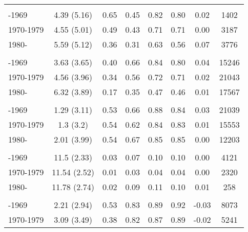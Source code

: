\begin{ThreePartTable}
\begin{longtable}[t]{lccccccc}
\addlinespace[0.3em]
\multicolumn{8}{l}{\textbf{Liberia}}\\
\hspace{1em}-1969 & 4.39 (5.16) & 0.65 & 0.45 & 0.82 & 0.80 & 0.02 & 1402\\
\hspace{1em}1970-1979 & 4.55 (5.01) & 0.49 & 0.43 & 0.71 & 0.71 & 0.00 & 3187\\
\hspace{1em}1980- & 5.59 (5.12) & 0.36 & 0.31 & 0.63 & 0.56 & 0.07 & 3776\\
\addlinespace[0.3em]
\multicolumn{8}{l}{\textbf{Malawi}}\\
\hspace{1em}-1969 & 3.63 (3.65) & 0.40 & 0.66 & 0.84 & 0.80 & 0.04 & 15246\\
\hspace{1em}1970-1979 & 4.56 (3.96) & 0.34 & 0.56 & 0.72 & 0.71 & 0.02 & 21043\\
\hspace{1em}1980- & 6.32 (3.89) & 0.17 & 0.35 & 0.47 & 0.46 & 0.01 & 17567\\
\addlinespace[0.3em]
\multicolumn{8}{l}{\textbf{Mali}}\\
\hspace{1em}-1969 & 1.29 (3.11) & 0.53 & 0.66 & 0.88 & 0.84 & 0.03 & 21039\\
\hspace{1em}1970-1979 & 1.3 (3.2) & 0.54 & 0.62 & 0.84 & 0.83 & 0.01 & 15553\\
\hspace{1em}1980- & 2.01 (3.99) & 0.54 & 0.67 & 0.85 & 0.85 & 0.00 & 12203\\
\addlinespace[0.3em]
\multicolumn{8}{l}{\textbf{Moldova}}\\
\hspace{1em}-1969 & 11.5 (2.33) & 0.03 & 0.07 & 0.10 & 0.10 & 0.00 & 4121\\
\hspace{1em}1970-1979 & 11.54 (2.52) & 0.01 & 0.03 & 0.04 & 0.04 & 0.00 & 2320\\
\hspace{1em}1980- & 11.78 (2.74) & 0.02 & 0.09 & 0.11 & 0.10 & 0.01 & 258\\
\addlinespace[0.3em]
\multicolumn{8}{l}{\textbf{Mozambique}}\\
\hspace{1em}-1969 & 2.21 (2.94) & 0.53 & 0.83 & 0.89 & 0.92 & -0.03 & 8073\\
\hspace{1em}1970-1979 & 3.09 (3.49) & 0.38 & 0.82 & 0.87 & 0.89 & -0.02 & 5241\\

\end{longtable}
\end{ThreePartTable}
